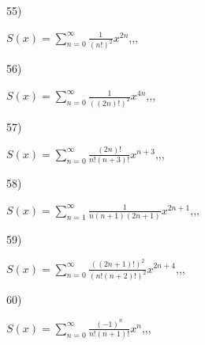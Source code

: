 \documentclass[11pt, ukrainian]{article}
\begin{document}
\par
\vspace{0.9cm}
55) \space 
{%
{$S(x)=\sum\limits_{n=0}^{\infty}{\frac{1}{(n!)^2}}{x^{{2n}}}$},,, \par \smallskip  
}
\par
\vspace{0.9cm}
56) \space 
{%
{$S(x)=\sum\limits_{n=0}^{\infty}{\frac{1}{((2n)!)^2}}{x^{{4n}}}$},,, \par \smallskip  
}
\par
\vspace{0.9cm}
57) \space 
{%
{$S(x)=\sum\limits_{n=0}^{\infty}{\frac{(2n)!}{n!(n+3)!}}{x^{{n+3}}}$},,, \par \smallskip  
}
\par
\vspace{0.9cm}
58) \space 
{%
{$S(x)=\sum\limits_{n=1}^{\infty}{\frac{1}{n(n+1)(2n+1)}}{x^{{2n+1}}}$},,, \par \smallskip  
}
\par
\vspace{0.9cm}
59) \space 
{%
{$S(x)=\sum\limits_{n=0}^{\infty}{\frac{((2n+1)!)^2}{(n!(n+2)!)^2}}{x^{{2n+4}}}$},,, \par \smallskip  
}
\par
\vspace{0.9cm}
60) \space 
{%
{$S(x)=\sum\limits_{n=0}^{\infty}{\frac{(-1)^n}{n!(n+1)!}}{x^{{n}}}$},,, \par \smallskip  
}
\end{document}
